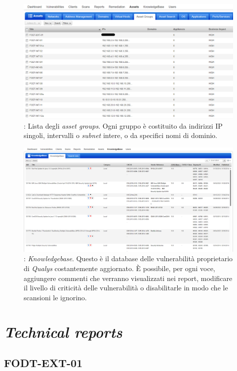 \documentclass[target=bach,aauheader=]{thud}
\begin{document}
\begin{figure}[!]
    \centering
    \includegraphics[width=1\linewidth]{images/qualys_targets.png}
    \caption{: Lista degli \textit{asset groups}. Ogni gruppo è costituito da indirizzi IP singoli, intervalli o \textit{subnet} intere, o da specifici nomi di dominio.}
    \label{fig:qualys_targets}
\end{figure}

\begin{figure}
\centering
\includegraphics[scale=0.35]{images/qualys_kb.png}
    \caption{: \textit{Knowledgebase}. Questo è il database delle vulnerabilità proprietario di \textit{Qualys} costantemente aggiornato. È possibile, per ogni voce, aggiungere commenti che verranno visualizzati nei report, modificare il livello di criticità delle vulnerabilità o disabilitarle in modo che le scansioni le ignorino.}
\end{figure}


\chapter{\textit{Technical reports}}
\label{appendix:reports}

\section{FODT-EXT-01}
\end{document}
